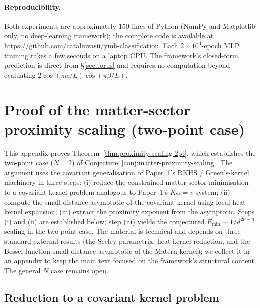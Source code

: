 \paragraph{Reproducibility.} Both experiments are approximately
$150$ lines of Python (NumPy and Matplotlib only, no deep-learning
framework); the complete code is available at
\url{https://github.com/catalinvasii/ymh-classification}. Each
$2\times 10^4$-epoch MLP training takes a few seconds on a laptop
CPU. The framework's closed-form prediction is direct from
\S\ref{sec:torus} and requires no computation beyond evaluating
$2\cos(\pi\alpha/L)\cos(\pi\beta/L)$.

\appendix

\section{Proof of the matter-sector proximity scaling (two-point case)}
\label{app:proximity-proof}

This appendix proves Theorem~\ref{thm:proximity-scaling-2pt}, which
establishes the two-point case ($N=2$) of
Conjecture~\ref{conj:matter-proximity-scaling}. The argument uses
the covariant generalisation of Paper~1's RKHS / Green's-kernel
machinery \cite[Theorem~13.3]{Vasii2026Paper1} in three steps: (i) reduce
the constrained matter-sector minimisation to a covariant kernel
problem analogous to Paper~1's $K\alpha=v$ system; (ii) compute the
small-distance asymptotic of the covariant kernel using local
heat-kernel expansion; (iii) extract the proximity exponent from the
asymptotic. Steps (i) and (ii) are established below; step (iii)
yields the conjectured $E_{\min}\sim 1/d^{2\nu-n}$ scaling in the
two-point case. The material is technical and depends on three
standard external results (the Seeley parametrix, heat-kernel
reduction, and the Bessel-function small-distance asymptotic of the
Mat\'ern kernel); we collect it in an appendix to keep the main text
focused on the framework's structural content. The general $N$ case
remains open.

\subsection{Reduction to a covariant kernel problem}
\label{ssec:proximity-kernel-problem}

